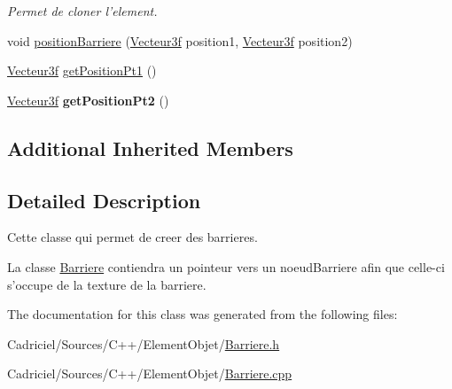\begin{DoxyCompactItemize}
\begin{DoxyCompactList}\small\item\em Permet de cloner l'element. \end{DoxyCompactList}\item 
void \hyperlink{group__inf2990_ga00c08e4b911e95aa83ddcd087ff09294}{position\-Barriere} (\hyperlink{group__utilitaire_ga6b2956069f76c7e27df4f79f87e5a48c}{Vecteur3f} position1, \hyperlink{group__utilitaire_ga6b2956069f76c7e27df4f79f87e5a48c}{Vecteur3f} position2)
\item 
\hyperlink{group__utilitaire_ga6b2956069f76c7e27df4f79f87e5a48c}{Vecteur3f} \hyperlink{group__inf2990_ga9993ac42c28c45c33526233cfcc302e0}{get\-Position\-Pt1} ()
\item 
\hypertarget{group__inf2990_ga45d889538f981bc7d4ebdb631b570ffe}{\hyperlink{group__utilitaire_ga6b2956069f76c7e27df4f79f87e5a48c}{Vecteur3f} {\bfseries get\-Position\-Pt2} ()}\label{group__inf2990_ga45d889538f981bc7d4ebdb631b570ffe}

\end{DoxyCompactItemize}
\subsection*{Additional Inherited Members}


\subsection{Detailed Description}
Cette classe qui permet de creer des barrieres. 

La classe \hyperlink{class_barriere}{Barriere} contiendra un pointeur vers un noeud\-Barriere afin que celle-\/ci s'occupe de la texture de la barriere. 

The documentation for this class was generated from the following files\-:\begin{DoxyCompactItemize}
\item 
Cadriciel/\-Sources/\-C++/\-Element\-Objet/\hyperlink{_barriere_8h}{Barriere.\-h}\item 
Cadriciel/\-Sources/\-C++/\-Element\-Objet/\hyperlink{_barriere_8cpp}{Barriere.\-cpp}\end{DoxyCompactItemize}
